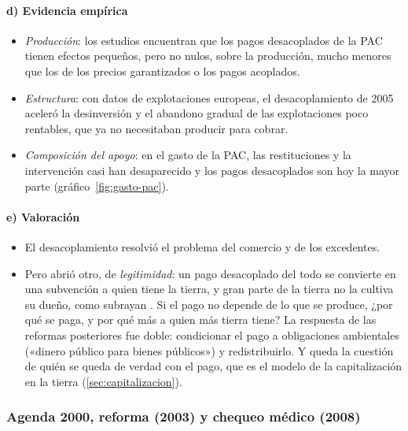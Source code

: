 \documentclass[11pt]{article}
\begin{document}
\paragraph{d) Evidencia empírica}

\begin{itemize}
\item \emph{Producción}: los estudios encuentran que los pagos desacoplados de la PAC tienen efectos pequeños, pero no nulos, sobre la producción, mucho menores que los de los precios garantizados o los pagos acoplados\nocite{OCDE2001Decoupling}.
\item \emph{Estructura}: con datos de explotaciones europeas, el desacoplamiento de 2005 aceleró la desinversión y el abandono gradual de las explotaciones poco rentables, que ya no necesitaban producir para cobrar\nocite{Kazukauskas2013Disinvestment}.
\item \emph{Composición del apoyo}: en el gasto de la PAC, las restituciones y la intervención casi han desaparecido y los pagos desacoplados son hoy la mayor parte (gráfico~\ref{fig:gasto-pac}).
\end{itemize}

\paragraph{e) Valoración}

\begin{itemize}
\item El desacoplamiento resolvió el problema del comercio y de los excedentes.
\item Pero abrió otro, de \emph{legitimidad}: un pago desacoplado del todo se convierte en una subvención a quien tiene la tierra, y gran parte de la tierra no la cultiva su dueño, como subrayan \textcite[sec.~9.6]{BaldwinWyplosz2020Economics}. Si el pago no depende de lo que se produce, ¿por qué se paga, y por qué más a quien más tierra tiene? La respuesta de las reformas posteriores fue doble: condicionar el pago a obligaciones ambientales («dinero público para bienes públicos») y redistribuirlo. Y queda la cuestión de quién se queda de verdad con el pago, que es el modelo de la capitalización en la tierra (\ref{sec:capitalizacion}).
\end{itemize}

\subsubsection{Agenda 2000, reforma  (2003)\cortetitulo{} y chequeo médico (2008)}\label{sec:fischler}
\end{document}
